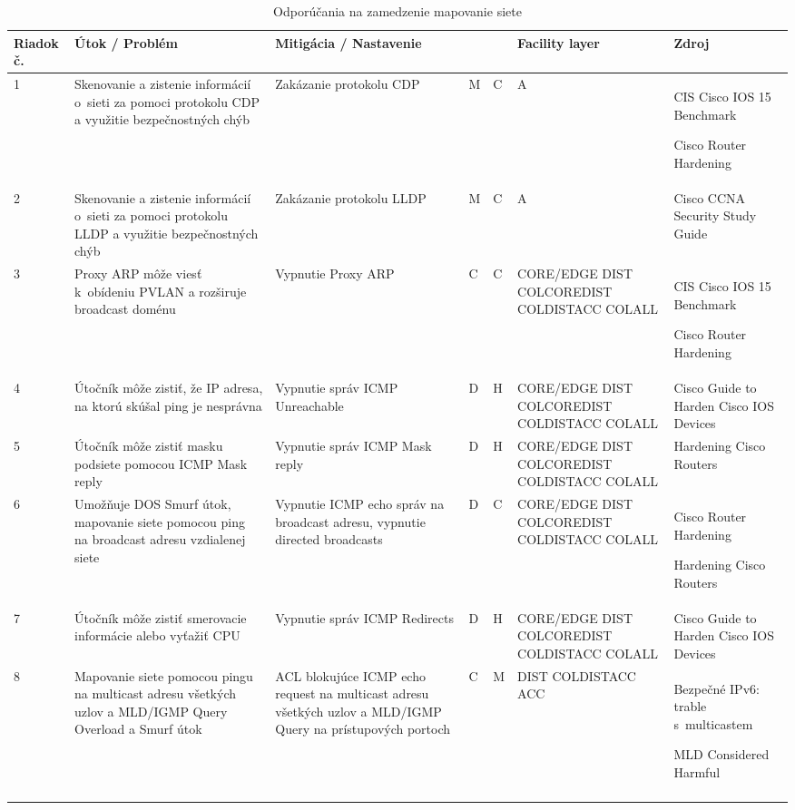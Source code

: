 \begin{longtable}[!htbp]{|C{2.5em}L{9em}L{9em}C{2em}C{2.5em}C{7.5em}L{10em}|}
	
	\hline
	\centering
	
	Riadok č.	&Útok / Problém	&Mitigácia / Nastavenie	& 	&	&Facility layer	&Zdroj\\
	\endhead
	
	 1	&Skenovanie a zistenie informácií o~sieti za pomoci protokolu CDP a využitie bezpečnostných chýb	&Zakázanie protokolu CDP	&M	&C	&A	&CIS Cisco IOS 15 Benchmark \cite{CIS_DrTLsgXv24lxeIIM}
	
	Cisco Router Hardening \cite{Graesser2001}\\
	2	&Skenovanie a zistenie informácií o~sieti za pomoci protokolu LLDP a využitie bezpečnostných chýb	&Zakázanie protokolu LLDP	&M	&C	&A	&Cisco CCNA Security Study Guide \cite{McMillan2018}\\
	 3	&Proxy ARP môže viesť k~obídeniu PVLAN a rozširuje broadcast doménu	&Vypnutie Proxy ARP	&C	&C	&CORE/EDGE
	DIST
	COLCOREDIST
	COLDISTACC
	COLALL	&CIS Cisco IOS 15 Benchmark \cite{CIS_DrTLsgXv24lxeIIM}
	
	Cisco Router Hardening \cite{Graesser2001}\\
	4	&Útočník môže zistiť, že IP adresa, na ktorú skúšal ping je nesprávna	&Vypnutie správ ICMP Unreachable	&D	&H	&CORE/EDGE
	DIST
	COLCOREDIST
	COLDISTACC
	COLALL	&Cisco Guide to Harden Cisco IOS Devices \cite{Singh2018}
	\\
	 5	&Útočník môže zistiť masku podsiete pomocou ICMP Mask reply	&Vypnutie správ ICMP Mask reply	&D	&H	&CORE/EDGE
	DIST
	COLCOREDIST
	COLDISTACC
	COLALL	&Hardening Cisco Routers \cite{Akin2002}
	\\
	6	&Umožňuje DOS Smurf útok, mapovanie siete pomocou ping na broadcast adresu vzdialenej siete	&Vypnutie ICMP echo správ na broadcast adresu, vypnutie directed broadcasts	&D	&C	&CORE/EDGE
	DIST
	COLCOREDIST
	COLDISTACC
	COLALL	&Cisco Router Hardening \cite{Graesser2001}
	
	Hardening Cisco Routers \cite{Akin2002}
	\\
	 7	&Útočník môže zistiť smerovacie informácie alebo vyťažiť CPU	&Vypnutie správ ICMP Redirects	&D	&H	&CORE/EDGE
	DIST
	COLCOREDIST
	COLDISTACC
	COLALL	&Cisco Guide to Harden Cisco IOS Devices \cite{Singh2018}
	\\
	8	&Mapovanie siete pomocou pingu na multicast adresu všetkých uzlov a MLD/IGMP Query Overload a Smurf útok	& ACL blokujúce ICMP echo request na multicast adresu všetkých uzlov a MLD/IGMP Query na prístupových portoch	&C	&M	&DIST
	COLDISTACC
	ACC	&Bezpečné IPv6: trable s~multicastem \cite{Podermanski532015}
	
	MLD Considered Harmful \cite{Rey2016}
	\\
	
	\hline
	\caption{Odporúčania na zamedzenie mapovanie siete}
	\label{tab:mapping}%
\end{longtable}%

